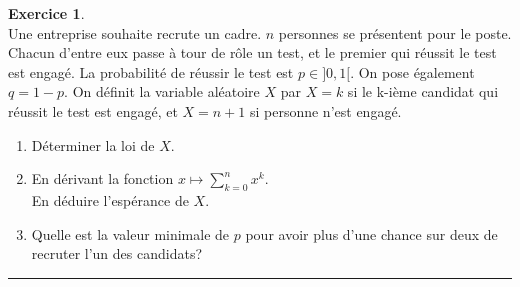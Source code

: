 \documentclass[a4paper,10pt]{article}
\theoremstyle{definition}
\theoremstyle{definition}
\newtheorem{exo}{Exercice}
\begin{document}
\begin{minipage}{1\linewidth}
\begin{minipage}[t]{0.48\linewidth}
	
	\begin{exo}\quad\\[0.2cm]
		Une entreprise souhaite recrute un cadre. $n$ personnes se présentent pour le poste. Chacun d'entre eux passe à tour de rôle un test, et le premier qui réussit le test est engagé. La probabilité de réussir le test est $p\in ]0,1[$. On pose également $q=1-p$. On définit la variable aléatoire $X$ par $X=k$ si le k-ième candidat qui réussit le test est engagé, et $X=n+1$ si personne n'est engagé.
		\begin{enumerate}
			\item Déterminer la loi de $X$.
			\item En dérivant la fonction  $x\mapsto \sum_{k=0}^{n}x^k$.\\[0.1cm]
			En déduire l'espérance de $X$. 
			\item Quelle est la valeur minimale de $p$ pour avoir plus d'une chance sur deux de recruter l'un des candidats? 
		\end{enumerate}
		\centering
		\rule{1\linewidth}{0.6pt}
	\end{exo}	

	


		
			
		
		
	\end{minipage}
\end{minipage}	
\end{document}
